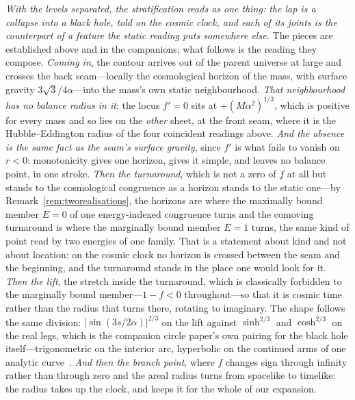 \documentclass[11pt,a4paper]{article}
\theoremstyle{plain}
\theoremstyle{definition}
\theoremstyle{remark}
\begin{document}
\emph{With the levels separated, the stratification reads as one thing: the lap is a collapse into a black hole,
told on the cosmic clock, and each of its joints is the counterpart of a feature the static reading puts
somewhere else.} The pieces are established above and in the companions; what follows is the reading they
compose.
\emph{Coming in}, the contour arrives out of the parent universe at large and crosses the back seam---locally
the cosmological horizon of the mass, with surface gravity $3\sqrt3/4\alpha$---into the mass's own static
neighbourhood. \emph{That neighbourhood has no balance radius in it}: the locus $f'=0$ sits at
$+(M\alpha^{2})^{1/3}$, which is positive for every mass and so lies on the \emph{other} sheet, at the front
seam, where it is the Hubble--Eddington radius of the four coincident readings above. \emph{And the absence is
the same fact as the seam's surface gravity}, since $f'$ is what fails to vanish on $r<0$: monotonicity gives
one horizon, gives it simple, and leaves no balance point, in one stroke. \emph{Then the turnaround}, which is
not a zero of $f$ at all but stands to the cosmological congruence as a horizon stands to the static one---by
Remark~\ref{rem:tworealisations}, the horizons are where the maximally bound member $E=0$ of one
energy-indexed congruence turns and the comoving turnaround is where the marginally bound member $E=1$ turns,
the same kind of point read by two energies of one family. That is a statement about kind and not about
location: on the cosmic clock no horizon is crossed between the seam and the beginning, and the turnaround
stands in the place one would look for it. \emph{Then the lift}, the stretch inside the turnaround, which is
classically forbidden to the marginally bound member---$1-f<0$ throughout---so that it is cosmic time rather
than the radius that turns there, rotating to imaginary. The shape follows the same division:
$\lvert\sin(3s/2\alpha)\rvert^{2/3}$ on the lift against $\sinh^{2/3}$ and $\cosh^{2/3}$ on the real legs,
which is the companion circle paper's own pairing for the black hole itself---trigonometric on the interior
arc, hyperbolic on the continued arms of one analytic curve~\cite{JanzenCircle}. \emph{And then the branch
point}, where $f$ changes sign through infinity rather than through zero and the areal radius turns from
spacelike to timelike: the radius takes up the clock, and keeps it for the whole of our expansion.
\end{document}
